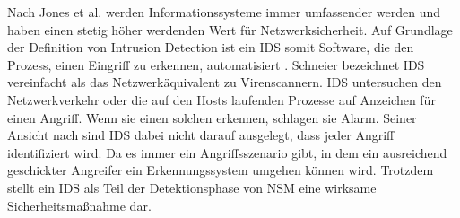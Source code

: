 Nach Jones et al. \cite{jones_computer_nodate} werden Informationssysteme immer umfassender werden und haben einen stetig höher werdenden Wert für Netzwerksicherheit. 
Auf Grundlage der Definition von Intrusion Detection ist ein IDS somit Software, die den Prozess, einen Eingriff zu erkennen, automatisiert \cite{scarfone2007guide}.
Schneier \cite{schneier_managed_2001} bezeichnet IDS vereinfacht als das Netzwerkäquivalent zu Virenscannern. IDS untersuchen den Netzwerkverkehr oder die auf den Hosts laufenden Prozesse auf Anzeichen für einen Angriff. Wenn sie einen solchen erkennen, schlagen sie Alarm. Seiner Ansicht nach sind IDS dabei nicht darauf ausgelegt, dass jeder Angriff identifiziert wird. Da es immer ein Angriffsszenario gibt, in dem ein ausreichend geschickter Angreifer ein Erkennungssystem umgehen können wird. Trotzdem stellt ein IDS als Teil der Detektionsphase von NSM eine wirksame Sicherheitsmaßnahme dar.


